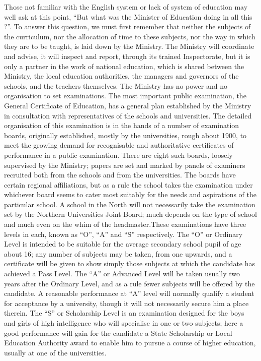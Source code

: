 Those not familiar with the English system or lack of system of education may well ask at this point, ``But what was the Minister of Education doing in all this ?''. To answer this question, we must first remember that neither the subjects of the curriculum, nor the allocation of time to these subjects, nor the way in which they are to be taught, is laid down by the Ministry. The Ministry will coordinate and advise, it will inspect and report, through its trained Inspectorate, but it is only a partner in the work of national education, which is shared between the Ministry, the local education authorities, the managers and governors of the schools, and the teachers themselves. The Ministry has no power and no organisation to set examinations. The most important public examination, the General Certificate of Education, has a general plan established by the Ministry in consultation with representatives of the schools and universities. The detailed organisation of this examination is in the hands of a number of examination boards, originally established, mostly by the universities, rough about 1900, to meet the growing demand for recognisable and authoritative certificates of performance in a public examination. There are eight such boards, loosely supervised by the Ministry; papers are set and marked by panels of examiners recruited both from the schools and from the universities. The boards have certain regional affiliations, but as a rule the school takes the examination under whichever board seems to cater most suitably for the needs and aspirations of the particular school. A school in the North will not necessarily take the examination set by the Northern Universities Joint Board; much depends on the type of school and much even on the whim of the headmaster.\pageoriginale These examinations have three levels in each, known as ``O'', ``A'' and ``S'' respectively. The ``O'' or Ordinary Level is intended to be suitable for the average secondary school pupil of age about 16; any number of subjects may be taken, from one upwards, and a certificate will be given to show simply those subjects at which the candidate has achieved a Pass Level. The ``A'' or Advanced Level will be taken usually two years after the Ordinary Level, and as a rule fewer subjects will be offered by the candidate. A reasonable performance at ``A'' level will normally qualify a student for acceptance by a university, though it will not necessarily secure him a place therein. The ``S'' or Scholarship Level is an examination designed for the boys and girls of high intelligence who will specialise in one or two subjects; here a good performance will gain for the candidate a State Scholarship or Local Education Authority award to enable him to pursue a course of higher education, usually at one of the universities.

